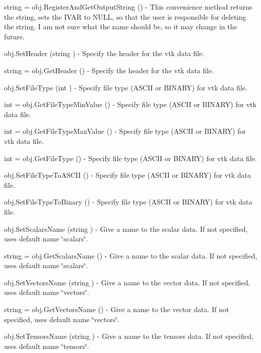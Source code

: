 \begin{DoxyItemize}
\item {\ttfamily string = obj.\-Register\-And\-Get\-Output\-String ()} -\/ This convenience method returns the string, sets the I\-V\-A\-R to N\-U\-L\-L, so that the user is responsible for deleting the string. I am not sure what the name should be, so it may change in the future.  
\item {\ttfamily obj.\-Set\-Header (string )} -\/ Specify the header for the vtk data file.  
\item {\ttfamily string = obj.\-Get\-Header ()} -\/ Specify the header for the vtk data file.  
\item {\ttfamily obj.\-Set\-File\-Type (int )} -\/ Specify file type (A\-S\-C\-I\-I or B\-I\-N\-A\-R\-Y) for vtk data file.  
\item {\ttfamily int = obj.\-Get\-File\-Type\-Min\-Value ()} -\/ Specify file type (A\-S\-C\-I\-I or B\-I\-N\-A\-R\-Y) for vtk data file.  
\item {\ttfamily int = obj.\-Get\-File\-Type\-Max\-Value ()} -\/ Specify file type (A\-S\-C\-I\-I or B\-I\-N\-A\-R\-Y) for vtk data file.  
\item {\ttfamily int = obj.\-Get\-File\-Type ()} -\/ Specify file type (A\-S\-C\-I\-I or B\-I\-N\-A\-R\-Y) for vtk data file.  
\item {\ttfamily obj.\-Set\-File\-Type\-To\-A\-S\-C\-I\-I ()} -\/ Specify file type (A\-S\-C\-I\-I or B\-I\-N\-A\-R\-Y) for vtk data file.  
\item {\ttfamily obj.\-Set\-File\-Type\-To\-Binary ()} -\/ Specify file type (A\-S\-C\-I\-I or B\-I\-N\-A\-R\-Y) for vtk data file.  
\item {\ttfamily obj.\-Set\-Scalars\-Name (string )} -\/ Give a name to the scalar data. If not specified, uses default name \char`\"{}scalars\char`\"{}.  
\item {\ttfamily string = obj.\-Get\-Scalars\-Name ()} -\/ Give a name to the scalar data. If not specified, uses default name \char`\"{}scalars\char`\"{}.  
\item {\ttfamily obj.\-Set\-Vectors\-Name (string )} -\/ Give a name to the vector data. If not specified, uses default name \char`\"{}vectors\char`\"{}.  
\item {\ttfamily string = obj.\-Get\-Vectors\-Name ()} -\/ Give a name to the vector data. If not specified, uses default name \char`\"{}vectors\char`\"{}.  
\item {\ttfamily obj.\-Set\-Tensors\-Name (string )} -\/ Give a name to the tensors data. If not specified, uses default name \char`\"{}tensors\char`\"{}.  

\end{DoxyItemize}
